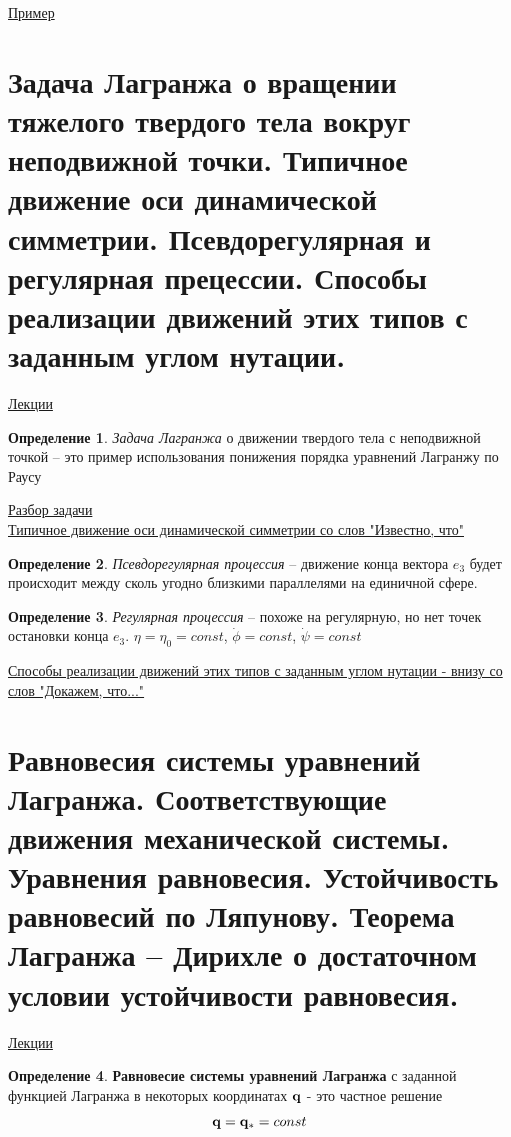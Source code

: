 \documentclass[specialist, subf, href, colorlinks=true, 12pt, times, mtpro, final]{disser}
\theoremstyle{definition}
\newtheorem{defn}{Определение}[section]
\begin{document}
    \noindent\hyperlink {lects.5}{Пример}\\
    
    
    \section{Задача Лагранжа о вращении тяжелого твердого тела вокруг неподвижной точки. Типичное движение оси динамической симметрии. Псевдорегулярная и регулярная прецессии. Способы реализации движений этих типов с заданным углом нутации.}
     \label{10}
    \hyperlink {lects.6}{Лекции} \\
    \begin{defn} 
    	{\it Задача Лагранжа} о движении твердого тела с неподвижной точкой \--- это пример использования понижения порядка уравнений Лагранжу по Раусу
    \end{defn}
     \noindent\hyperlink {lects.6}{Разбор задачи}\\
      \noindent\hyperlink {lects.7}{Типичное движение оси динамической симметрии со слов "Известно, что"}\\
    
    \begin{defn} 
    	{\it Псевдорегулярная процессия} \--- движение конца вектора $e_3$ будет происходит между сколь угодно близкими параллелями на единичной сфере.
    \end{defn}
    \begin{defn} 
    	{\it Регулярная процессия} \--- похоже на регулярную, но нет точек остановки конца $e_3$. $\eta = \eta_0=const$, $\dot{\phi}=const$, $\dot{\psi} = const$
    \end{defn}
    
     \noindent\hyperlink {lects.7}{Способы реализации движений этих типов с заданным углом нутации -  внизу со слов "Докажем, что..."}\\
    
    \section{Равновесия системы уравнений Лагранжа. Соответствующие движения механической системы. Уравнения равновесия. Устойчивость равновесий по Ляпунову. Теорема Лагранжа – Дирихле о достаточном условии устойчивости равновесия.}
     \label{11}
    \hyperlink {lects.10}{Лекции} \\
    	\begin{defn}
    		\textbf{Равновесие системы уравнений Лагранжа} с заданной функцией Лагранжа в некоторых координатах $\mathbf{q}$ - это частное решение 
    		$$
    			\mathbf{q} = \mathbf{q}_* = const
    		$$
    	\end{defn}
    
\end{document}
